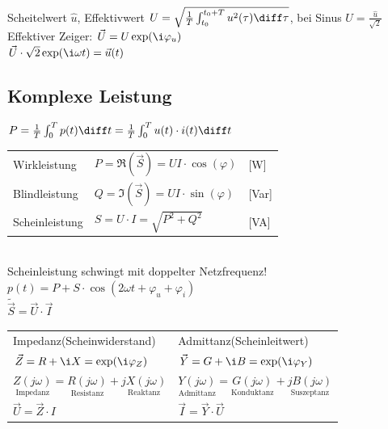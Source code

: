 \documentclass[european]{latex4ei_sheet}
\begin{document}
	
		Scheitelwert $\hat u$, Effektivwert $U = \sqrt{\frac{1}{T} \int_{t_0}^{t_0 + T} u^2(\tau) \diff \tau}$,
		bei Sinus $U = \frac{\hat u}{\sqrt{2}}$\\
		Effektiver Zeiger: $\vec U = U \exp(\i \varphi_u)$\\
		
		$\vec U \cdot \sqrt{2} \exp(\i \omega t) = \vec u(t)$	
	

	
		\subsection{Komplexe Leistung}
		$P = \frac1T \int_0^{T} p(t) \diff t = \frac1T \int_0^{T} u(t) \cdot i(t) \diff t$\\
		\begin{tabular}{lll}
		Wirkleistung & $P = \Re(\vec S) = U I \cdot \cos(\varphi)$ & [W] \\
		Blindleistung & $Q = \Im(\vec S) = U I \cdot \sin(\varphi)$ & [Var]\\
		Scheinleistung & $S = U \cdot I = \sqrt{P^2 + Q^2}$ & [VA]\\
		\end{tabular}
		 \qquad
		\\
		
		Scheinleistung schwingt mit doppelter Netzfrequenz!
		$p(t) = P + S \cdot \cos(2\omega t + \varphi_u + \varphi_i)$\\
		$\tilde {\vec S} = \vec U \cdot \vec I$\\

		\begin{tabular}{ll}
		Impedanz(Scheinwiderstand) & Admittanz(Scheinleitwert)\\
		$\vec Z = R + \i X = \exp(\i \varphi_Z)$ & $\vec Y = G + \i B = \exp(\i \varphi_Y)$\\
		$\underset{\text{Impedanz}}{Z(j\omega)} = \underset{\text{Resistanz}}{R(j\omega)} + \underset{\text{Reaktanz}}{jX(j\omega)}$ & 	$\underset{\text{Admittanz}}{Y(j\omega)} = \underset{\text{Konduktanz}}{G(j\omega)} + \underset{\text{Suszeptanz}}{jB(j\omega)}$\\
		$\vec U = \vec Z \cdot I $ & $\vec I = \vec Y \cdot \vec U$\\

		\end{tabular}
\end{document}
